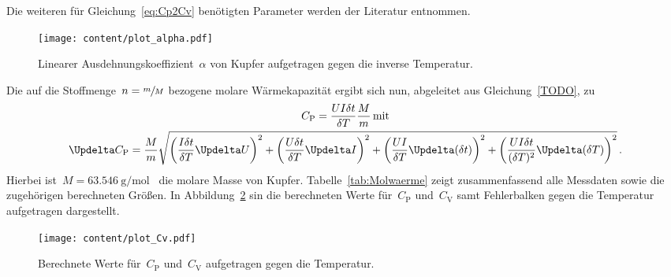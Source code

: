 %
Die weiteren für Gleichung~\eqref{eq:Cp2Cv} benötigten Parameter werden der
Literatur entnommen.
%
\begin{figure}[htb]
    \centering
    \texttt{[image: content/plot\_alpha.pdf]}
    \caption{Linearer Ausdehnungskoeffizient~$\alpha$ von Kupfer aufgetragen
    gegen die inverse Temperatur.}
    \label{fig:plot_alpha}
\end{figure}
%
Die auf die Stoffmenge~$n=\sfrac{m}{M}$ bezogene molare Wärmekapazität ergibt
sich nun, abgeleitet aus Gleichung~\eqref{TODO}, zu
%
\begin{gather}
  C_{\mathrm{P}}=\frac{UI\delta t}{\delta T}\frac{M}{m}\,\text{mit} \\
  \Updelta C_{\mathrm{P}}=\frac{M}{m}\sqrt{\left(\frac{I\delta t}{\delta T}\Updelta U\right)^2+\left(\frac{U\delta t}{\delta T}\Updelta I\right)^2+\left(\frac{UI}{\delta T}\Updelta(\delta t)\right)^2+\left(\frac{UI\delta t}{(\delta T)^2}\Updelta(\delta T)\right)^2}\, .
\end{gather}
%
Hierbei ist~$M=\SI{63.546}{\gram\per\mol}$~\cite{mathematica} die molare Masse
von Kupfer. Tabelle~\ref{tab:Molwaerme} zeigt zusammenfassend alle Messdaten
sowie die zugehörigen berechneten Größen. In Abbildung~\ref{fig:plot_Cv} sin
die berechneten Werte für~$C_{\mathrm{P}}$ und~$C_{\mathrm{V}}$ samt
Fehlerbalken gegen die Temperatur aufgetragen dargestellt.
%
\begin{figure}[htb]
    \centering
    \texttt{[image: content/plot\_Cv.pdf]}
    \caption{Berechnete Werte für~$C_{\mathrm{P}}$ und~$C_{\mathrm{V}}$
    aufgetragen gegen die Temperatur.}
    \label{fig:plot_Cv}
\end{figure}
%
